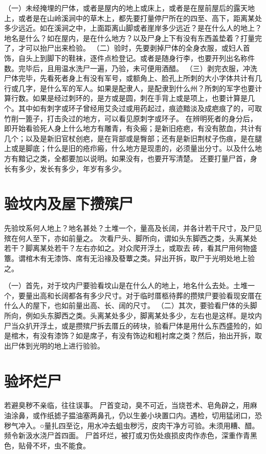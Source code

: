 \documentclass[12pt,UTF8]{ctexbook}
\begin{document}
（一）未经掩埋的尸体，或者是屋内的地上或床上，或者是在屋前屋后的露天地上，或者是在山岭溪涧中的草木上，都先要打量停尸所在的四至、高下，距离某处多少远近。如在溪涧之中，上面距离山脚或者崖岸多少远近？是在什么人的地上？地名是什么？如在屋内，是在什么地方？以及尸身上下有没有东西盖垫着？打量完了，才可以抬尸出来检验。
（二）验时，先要剥掉尸体的全身衣服，或妇人首饰，自头上到脚下的鞋袜，逐件点检登记。或者是随身行李，也要开列出名称件数。完毕后，且用温水洗尸一遍，乃验，未可便用酒醋。
（三）剥完衣服，冲洗尸体完毕，先看死者身上有没有军号，或额角上、脸孔上所刺的大小字体共计有几行或几字，是什么军的军人。如果是配隶人，是配隶到什么州？所刺的军字也要计算行数。如果是经过刺环的，是方或是圆，刺在手背上或是项上，也要计算是几个。其中如有刺字或环子曾经用艾灸过或用药起过，痕迹黯淡及成疤痕了的，可取竹削一篦子，打击灸过的地方，可以看见原刺字或环子。
在辨明死者的身分后，即开始看验死人身上什么地方有雕青，有灸瘢；是新旧疮疤，有没有脓血，共计有几个；以及是新旧官杖创疤，是在背部或是臀部；还有是新旧荆杖子伤痕，是在腿上或是脚底；什么是旧的疮疖瘢，什么地方是现患的，必须量出分寸。以及什么地方有黯记之类，全都要加以说明。如果没有，也要开写清楚。
还要打量尸首，身长有多少，发长有多少，年岁有多少。


\chapter{验坟内及屋下攒殡尸}

先验坟系何人地上？地名甚处？土堆一个，量高及长阔，并各计若干尺寸，及尸见 殡在何人至下，亦如前量之。
次看尸头、脚所向，谓如头东脚西之类，头离某处若干？脚离某处若干？左右亦如之。对众爬开浮土，或取去 砖，看其尸用何物盛簟。谓棺木有无漆饰、席有无沿禒及蕟蕈之类。舁出开拆，取尸于光明处地上验之。



（一）首先，对于坟内尸要验看坟山是在什么人的地上，地名什么去处。土堆一个，要量出高和长阔都各有多少尺寸。对于临时厝柩待葬的攒殡尸要验看现安厝在什么人的屋下，也如前量出高、长、阔的尺寸。
（二）其次，要验看尸体的头脚所向，例如头东脚西之类。头离某处多少，脚离某处多少，左右也是这样。是坟内尸当众扒开浮土，或是攒殡尸拆去厝丘的砖块，验看尸体是用什么东西盛殓的，如是棺木，有没有漆饰？如是席子，有没有饰边和粗衬席之类？然后，抬出开拆，取出尸体到光明的地上进行验验。


\chapter{验坏烂尸}

若避臭秽不亲临，往往误事。
尸首变动，臭不可近，当烧苍术、皂角辟之，用麻油涂鼻，或作纸摅子揾油塞两鼻孔，仍以生姜小块置口内。遇检，切用猛闭口，恐秽气冲入。○量扎四至讫，用水冲去蛆虫秽污，皮肉干净方可验。未须用糟、醋。频令新汲水浇尸首四面。
尸首坏烂，被打或刃伤处痕损皮肉作赤色，深重作青黑色，贴骨不坏，虫不能食。
\end{document}
